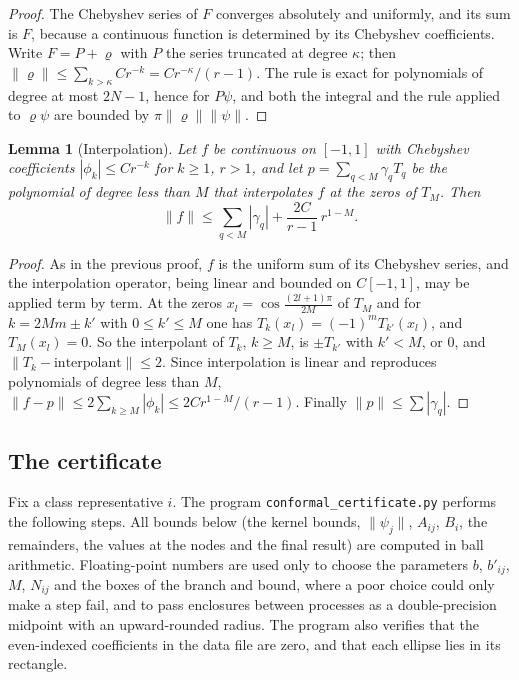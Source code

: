 \documentclass[11pt]{amsart}
\newtheorem{lemma}[proposition]{Lemma}
\theoremstyle{remark}
\begin{document}
\begin{proof}
The Chebyshev series of $F$ converges absolutely and uniformly, and its sum is $F$, because a continuous
function is determined by its Chebyshev coefficients. Write $F=P+\varrho$ with $P$ the series truncated at
degree $\kappa$; then
$\|\varrho\|\le\sum_{k>\kappa}Cr^{-k}=Cr^{-\kappa}/(r-1)$. The rule is exact for polynomials of degree at most
$2N-1$, hence for $P\psi$, and both the integral and the rule applied to $\varrho\psi$ are bounded by
$\pi\|\varrho\|\|\psi\|$.
\end{proof}

\begin{lemma}[Interpolation]\label{lem:interp}
Let $f$ be continuous on $[-1,1]$ with Chebyshev coefficients $|\phi_k|\le Cr^{-k}$ for $k\ge1$, $r>1$, and
let $p=\sum_{q<M}\gamma_qT_q$ be the polynomial of degree less than $M$ that interpolates $f$ at the zeros of
$T_M$. Then
\[
\|f\|\le\sum_{q<M}|\gamma_q|+\frac{2C}{r-1}\,r^{1-M}.
\]
\end{lemma}

\begin{proof}
As in the previous proof, $f$ is the uniform sum of its Chebyshev series, and the interpolation operator, being
linear and bounded on $C[-1,1]$, may be applied term by term.
At the zeros $x_l=\cos\frac{(2l+1)\pi}{2M}$ of $T_M$ and for $k=2Mm\pm k'$ with $0\le k'\le M$ one has
$T_k(x_l)=(-1)^mT_{k'}(x_l)$, and $T_M(x_l)=0$. So the interpolant of $T_k$, $k\ge M$, is $\pm T_{k'}$ with
$k'<M$, or $0$, and $\|T_k-\text{interpolant}\|\le2$. Since interpolation is linear and reproduces polynomials
of degree less than $M$, $\|f-p\|\le2\sum_{k\ge M}|\phi_k|\le2Cr^{1-M}/(r-1)$. Finally
$\|p\|\le\sum|\gamma_q|$.
\end{proof}

\subsection{The certificate}\label{sec:cert}

Fix a class representative $i$. The program \texttt{conformal\_certificate.py} performs the following steps.
All bounds below (the kernel bounds, $\|\psi_j\|$, $A_{ij}$, $B_i$, the remainders, the values at the nodes and
the final result) are computed in ball arithmetic. Floating-point numbers are used only to choose the parameters
$b$, $b'_{ij}$, $M$, $N_{ij}$ and the boxes of the branch and bound, where a poor choice could only make a step
fail, and to pass enclosures between processes as a double-precision midpoint with an upward-rounded radius.
The program also verifies that the even-indexed coefficients in the data file are zero, and that each ellipse lies
in its rectangle.
\end{document}
